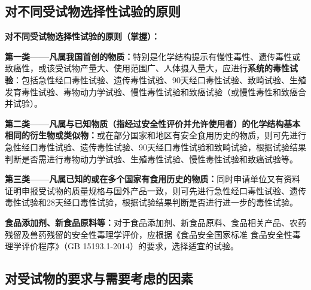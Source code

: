 \subsection{对不同受试物选择性试验的原则}

\begin{keybox}
\textbf{对不同受试物选择性试验的原则（掌握）：}

\textbf{第一类——凡属我国首创的物质：}特别是化学结构提示有慢性毒性、遗传毒性或致癌性，或该受试物产量大、使用范围广、人体摄入量大，应进行\textbf{系统的毒性试验}：包括急性经口毒性试验、遗传毒性试验、90天经口毒性试验、致畸试验、生殖发育毒性试验、毒物动力学试验、慢性毒性试验和致癌试验（或慢性毒性和致癌合并试验）。

\textbf{第二类——凡属与已知物质（指经过安全性评价并允许使用者）的化学结构基本相同的衍生物或类似物：}或在部分国家和地区有安全食用历史的物质，则可先进行急性经口毒性试验、遗传毒性试验、90天经口毒性试验和致畸试验，根据试验结果判断是否需进行毒物动力学试验、生殖毒性试验、慢性毒性试验和致癌试验等。

\textbf{第三类——凡属已知的或在多个国家有食用历史的物质：}同时申请单位又有资料证明申报受试物的质量规格与国外产品一致，则可先进行急性经口毒性试验、遗传毒性试验和28天经口毒性试验，根据试验结果判断是否进行进一步的毒性试验。

\textbf{食品添加剂、新食品原料等：}对于食品添加剂、新食品原料、食品相关产品、农药残留及兽药残留的安全性毒理学评价，应根据《食品安全国家标准 食品安全性毒理学评价程序》（GB 15193.1-2014）的要求，选择适宜的试验。
\end{keybox}

\subsection{对受试物的要求与需要考虑的因素}

